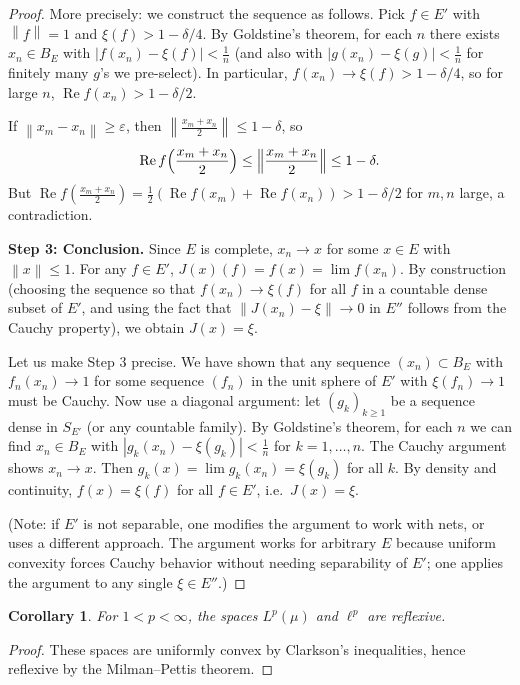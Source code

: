 \documentclass[a4paper,12pt]{book}
\newcommand{\norm}[1]{\left\| #1 \right\|}
\theoremstyle{definition}
\theoremstyle{plain}
\newtheorem{corollary}[definition]{Corollary}
\theoremstyle{remark}
\begin{document}
\begin{proof}
More precisely: we construct the sequence as follows.  Pick $f\in E'$ with
$\norm{f}=1$ and $\xi(f)>1-\delta/4$.  By Goldstine's theorem, for each $n$
there exists $x_n\in B_E$ with $|f(x_n)-\xi(f)|<\frac{1}{n}$ (and also
with $|g(x_n)-\xi(g)|<\frac{1}{n}$ for finitely many $g$'s we pre-select).
In particular, $f(x_n)\to\xi(f)>1-\delta/4$, so for large $n$,
$\operatorname{Re} f(x_n)>1-\delta/2$.

If $\norm{x_m-x_n}\ge\varepsilon$, then $\norm{\frac{x_m+x_n}{2}}\le 1-\delta$, so
\[
  \operatorname{Re} f\Bigl(\frac{x_m+x_n}{2}\Bigr) \le \Bigl\|\frac{x_m+x_n}{2}\Bigr\| \le 1-\delta.
\]
But $\operatorname{Re} f(\frac{x_m+x_n}{2}) = \frac{1}{2}(\operatorname{Re} f(x_m)+\operatorname{Re} f(x_n))
> 1-\delta/2$ for $m,n$ large, a contradiction.

\medskip\noindent\textbf{Step 3: Conclusion.}
Since $E$ is complete, $x_n\to x$ for some $x\in E$ with $\norm{x}\le 1$.
For any $f\in E'$, $J(x)(f)=f(x)=\lim f(x_n)$.  By construction (choosing
the sequence so that $f(x_n)\to\xi(f)$ for all $f$ in a countable dense
subset of $E'$, and using the fact that $\norm{J(x_n)-\xi}\to 0$ in $E''$
follows from the Cauchy property), we obtain $J(x)=\xi$.

Let us make Step 3 precise.  We have shown that any sequence $(x_n)\subset B_E$
with $f_n(x_n)\to 1$ for some sequence $(f_n)$ in the unit sphere of $E'$
with $\xi(f_n)\to 1$ must be Cauchy.  Now use a diagonal argument: let
$(g_k)_{k\ge 1}$ be a sequence dense in $S_{E'}$ (or any countable family).
By Goldstine's theorem, for each $n$ we can find $x_n\in B_E$ with
$|g_k(x_n)-\xi(g_k)|<\frac{1}{n}$ for $k=1,\ldots,n$.  The Cauchy argument
shows $x_n\to x$.  Then $g_k(x) = \lim g_k(x_n) = \xi(g_k)$ for all $k$.
By density and continuity, $f(x)=\xi(f)$ for all $f\in E'$, i.e.\ $J(x)=\xi$.

(Note: if $E'$ is not separable, one modifies the argument to work with nets,
or uses a different approach.  The argument works for arbitrary $E$ because
uniform convexity forces Cauchy behavior without needing separability of $E'$;
one applies the argument to any single $\xi\in E''$.)
\end{proof}

\begin{corollary}\label{cor:Lp-reflexive}
For $1<p<\infty$, the spaces $L^p(\mu)$ and $\ell^p$ are reflexive.
\end{corollary}

\begin{proof}
These spaces are uniformly convex by Clarkson's inequalities, hence reflexive
by the Milman--Pettis theorem.
\end{proof}
\end{document}
